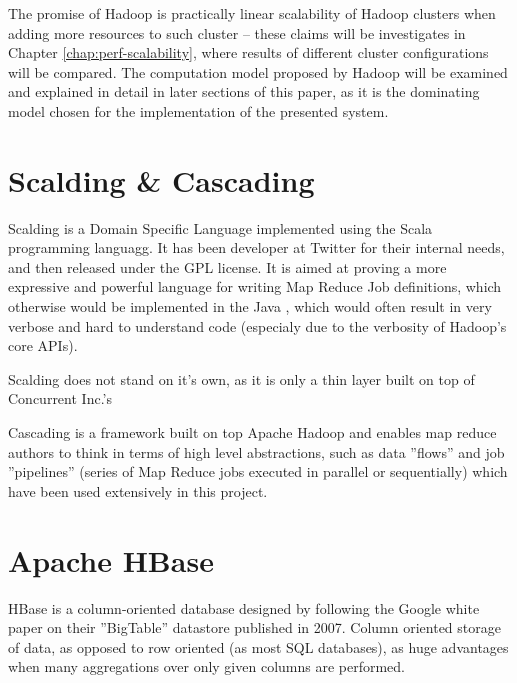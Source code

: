 The promise of Hadoop is practically linear scalability of Hadoop clusters when adding more resources to such cluster -- these claims will be investigates in Chapter \ref{chap:perf-scalability}, where results of different cluster configurations will be compared. The computation model proposed by Hadoop will be examined and explained in detail in later sections of this paper, as it is the dominating model chosen for the implementation of the presented system.

\section{Scalding \& Cascading}
\label{sec:scalding-info}

Scalding \cite{scalding} is a Domain Specific Language implemented using the Scala \cite{scala} programming languagg. It has been developer at Twitter \cite{twitter} for their internal needs, and then released under the GPL license. It is aimed at proving a more expressive and powerful language for writing Map Reduce Job definitions, which otherwise
would be implemented in the Java \cite{java}, which would often result in very verbose and hard to understand code (especialy due to the verbosity of Hadoop's core APIs).

Scalding does not stand on it's own, as it is only a thin layer built on top of Concurrent Inc.'s \cite{concurrent-inc}

Cascading is a framework built on top Apache Hadoop and enables map reduce authors to think in terms of high level abstractions, such as data ''flows'' 
and job ''pipelines'' (series of Map Reduce jobs executed in parallel or sequentially) which have been used extensively in this project.


\section{Apache HBase}
\label{sec:hbase}

HBase is a column-oriented database \cite{columnar-database} designed by following the Google white paper on their ''BigTable'' datastore published in 2007.
Column oriented storage of data, as opposed to row oriented (as most SQL databases), as huge advantages when many aggregations over only given columns are performed.

